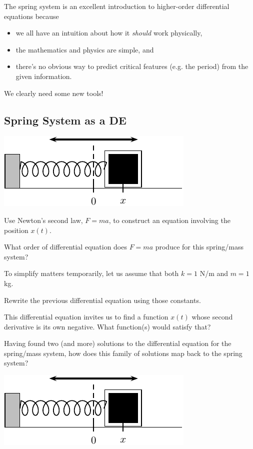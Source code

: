 The spring system is an excellent introduction to higher-order differential equations because 
\begin{itemize}
\item we all have an intuition about how it \emph{should} work physically,
\item the mathematics and physics are simple, and
\item there's no obvious way to predict critical features (e.g. the
  period) from the given information.
\end{itemize}
We clearly need some new tools!

\newpage
{}
\subsection*{Spring System as a DE}
\begin{center}
\includegraphics[width=0.35\linewidth]{graphics/notes_08_block}
\end{center}

\problem Use Newton's second law, $F = ma$, to construct an equation
involving the position $x(t)$.  \vfill

What order of differential equation does $F=ma$ produce for this
spring/mass system?

\vspace{1.3in}

\newpage

To simplify matters temporarily, let us assume that both
  $k = 1 $ N/m and $m = 1$ kg. 

  \problem Rewrite the previous differential equation using those
  constants.  \vspace{1.5in}

  This differential equation invites us to find a function $x(t)$
  whose second derivative is its own negative.  What function(s) would
  satisfy that?  \vfill

\newpage

\problem Having found two (and more) solutions to the differential
equation for the spring/mass system, how does this family of solutions
map back to the spring system?

\begin{center}
\includegraphics[width=0.4\linewidth]{graphics/notes_08_block}
\end{center}

